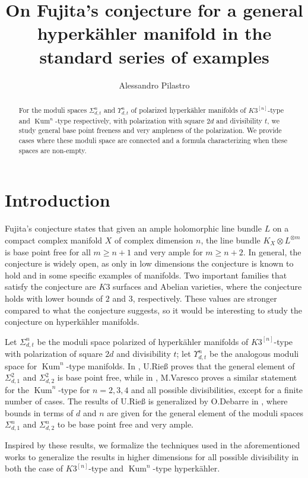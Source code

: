 \documentclass{article}
\title{On Fujita's conjecture for a general hyperk\"ahler manifold in the standard series of examples}
\author{Alessandro Pilastro}
\date{}
\DeclareMathOperator{\Kum}{Kum}
\newcommand{\hilb}[2][n]{#2^{[#1]}}
\begin{document}
\maketitle
\begin{abstract}
   For the moduli spaces $\Sigma_{d,t}^n$ and $\Upsilon_{d,t}^n$ of polarized hyperk\"ahler manifolds of $\hilb{K3}$-type and $\Kum^n$-type respectively, with polarization with square $2d$ and divisibility $t$, we study general base point freeness and very ampleness of the polarization. We provide cases where these moduli space are connected and a formula characterizing when these spaces are non-empty.
\end{abstract}

\section*{Introduction}

Fujita's conjecture states that given an ample holomorphic line bundle $L$ on a compact complex manifold $X$ of complex dimension $n$, the line bundle $K_X\otimes L^{\otimes m}$ is base point free for all $m\geq n+1$ and very ample for $m\geq n+2$. In general, the conjecture is widely open, as only in low dimensions the conjecture is known to hold and in some specific examples of manifolds. Two important families that satisfy the conjecture are $K3$ surfaces and Abelian varieties, where the conjecture holds with lower bounds of $2$ and $3$, respectively. These values are stronger compared to what the conjecture suggests, so it would be interesting to study the conjecture on hyperk\"ahler manifolds.

Let $\Sigma_{d,t}^n$ be the moduli space polarized of hyperk\"ahler manifolds of $\hilb{K3}$-type with polarization of square $2d$ and divisibility $t$; let $\Upsilon_{d,t}^n$ be the analogous moduli space for $\Kum^n$-type manifolds. In \cite{riess}, U.Rie{\ss} proves that the general element of $\Sigma_{d,1}^2$ and $\Sigma_{d,2}^2$ is base point free, while in \cite{Varesco_2023}, M.Varesco proves a similar statement for the $\Kum^n$-type for $n=2,3,4$ and all possible divisibilities, except for a finite number of cases. The results of U.Rie{\ss} is generalized by O.Debarre in \cite{debarre2020hyperkahlermanifolds}, where bounds in terms of $d$ and $n$ are given for the general element of the moduli spaces $\Sigma_{d,1}^n$ and $\Sigma_{d,2}^n$ to be base point free and very ample. 

Inspired by these results, we formalize the techniques used in the aforementioned works to generalize the results in higher dimensions for all possible divisibility in both the case of $\hilb{K3}$-type and $\Kum^n$-type hyperk\"ahler. 
\end{document}

